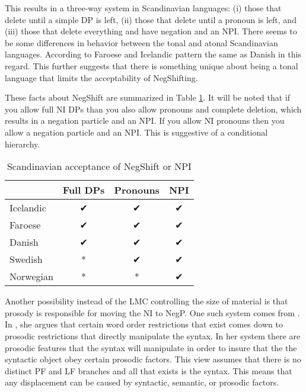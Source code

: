\documentclass[12pt, letterpaper]{article}
\begin{document}
This results in a three-way system in Scandinavian languages: (i) those that delete until a simple DP is left, (ii) those that delete until a pronoun is left, and (iii) those that delete everything and have negation and an NPI. There seems to be some differences in behavior between the tonal and atonal Scandinavian languages. According to \citet{thrainssonFaroeseOverviewReference2004,thrainssonSyntaxIcelandic2010} Faroese and Icelandic pattern the same as Danish in this regard. This further suggests that there is something unique about being a tonal language that limits the acceptability of NegShifting. 

These facts about NegShift are summarized in Table \ref{tab:Paradigm}. It will be noted that if you allow full NI DPs than you also allow pronouns and complete deletion, which results in a negation particle and an NPI. If you allow NI pronouns then you allow a negation particle and an NPI. This is suggestive of a conditional hierarchy. 

\begin{table}[!hb]
	\centering
	\caption{Scandinavian acceptance of NegShift or NPI}
	\label{tab:Paradigm}
\begin{tabular}{lccc}
	\hline 
	& Full DPs & Pronouns & NPI\\
	\hline
	Icelandic & ✔︎ & ✔︎ & ✔︎ \\
	Faroese & ✔︎ & ✔︎ & ✔︎ \\
	Danish & ✔︎ & ✔︎ & ✔︎ \\
	Swedish & * & ✔︎ & ✔︎ \\
	Norwegian & * & * & ✔︎ \\
	\hline 
\end{tabular} 
\end{table}

Another possibility instead of the LMC controlling the size of material is that prosody is responsible for moving the NI to NegP. One such system comes from \citet{zubizarretaProsodyFocusWord1998}. In \citet{zubizarretaProsodyFocusWord1998}, she argues that certain word order restrictions that exist comes down to prosodic restrictions that directly manipulate the syntax. In her system there are prosodic features that the syntax will manipulate in order to insure that the the syntactic object obey certain prosodic factors. This view assumes that there is no distinct PF and LF branches and all that exists is the syntax. This means that any displacement can be caused by syntactic, semantic, or prosodic factors. 
\end{document}
